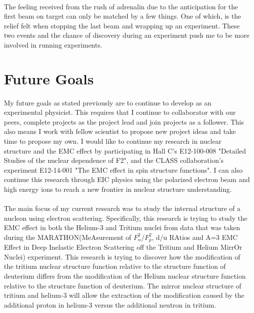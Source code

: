 \documentclass[12pt,letterpaper]{article}
\begin{document}
\paragraph{} The feeling received from the rush of adrenalin due to the anticipation for the first beam on target can only be matched by a few things. One of which, is the relief felt when stopping the last beam and wrapping up an experiment. These two events and the chance of discovery during an experiment push me to be more involved in running experiments.
\vspace{-1em}
\section*{Future Goals}
\paragraph{}My future goals as stated previously are to continue to develop as an experimental physicist. This requires that I continue to collaborator with our peers, complete projects as the project lead and join projects as a follower. This also means I work with fellow scientist to propose new project ideas and take time to propose my own. I would like to continue my research in nuclear structure and the EMC effect by participating in Hall C's E12-100-008 "Detailed Studies of the nuclear dependence of F2", and the CLASS collaboration's experiment E12-14-001 "The EMC effect in spin structure functions". I can also continue this research through EIC physics using the polarized electron beam and high energy ions to reach a new frontier in nuclear structure understanding. 







\iffalse
\paragraph{}The main focus of my current research was to study the internal structure of a nucleon using electron scattering. Specifically, this research is trying to study the EMC effect in both the Helium-3 and Tritium nuclei from data that was taken during the MARATHON(MeAsurement of $F_n^2/F_p^2$, d/u RAtios and A=3 EMC Effect in Deep Inelastic Electron Scattering off the Tritium and Helium MirrOr Nuclei) experiment. This research is trying to discover how the modification of the tritium nuclear structure function relative to the structure function of deuterium differs from the modification of the Helium nuclear structure function relative to the structure function of deuterium. The mirror nuclear structure of tritium and helium-3 will allow the extraction of the modification caused by the additional proton in helium-3 versus the additional neutron in tritium. 
\end{document}
